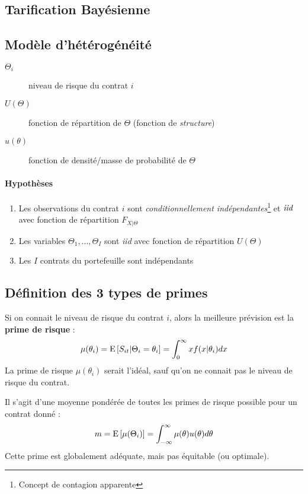 \documentclass[10pt, french]{article}
\begin{document}
\begin{multicols*}{3}
\columnbreak
\section{Tarification Bayésienne}
\subsection*{Modèle d'hétérogénéité}
\begin{description}
\item[$\Theta_i$] niveau de risque du contrat $i$
\item[$U(\Theta)$] fonction de répartition de $\Theta$ (fonction de \emph{structure})
\item[$u(\theta)$] fonction de densité/masse de probabilité de $\Theta$
\end{description}
\paragraph{Hypothèses}
\begin{enumerate}
\item Les observations du contrat $i$ sont \emph{conditionnellement indépendantes}\footnote{Concept de contagion apparente} et $\emph{iid}$ avec fonction de répartition $F_{X|\Theta}$
\item Les variables $\Theta_1, ..., \Theta_I$ sont \emph{iid} avec fonction de répartition $U(\Theta)$
\item Les $I$ contrats du portefeuille sont indépendants
\end{enumerate}

\subsection*{Définition des 3 types de primes}
\begin{definition}
Si on connait le niveau de risque du contrat $i$, alors la meilleure prévision est la \textbf{prime de risque} : 
\begin{equation}
\mu(\theta_i) = \mathrm{E} \left[ S_{it} | \Theta_i = \theta_i \right] = \int_{0}^{\infty} x f(x | \theta_i) dx
\end{equation}
La prime de risque $\mu(\theta_i)$ serait l'idéal, sauf qu'on ne connait pas le niveau de risque du contrat.
\end{definition}

\begin{definition}
Il s'agit d'une moyenne pondérée de toutes les primes de risque possible pour un contrat donné : 
\begin{equation}
m = \mathrm{E} \left[ \mu(\Theta_i) \right] = \int_{-\infty}^{\infty} \mu(\theta) u(\theta) d\theta
\end{equation}
Cette prime est globalement adéquate, mais pas équitable (ou optimale).
\end{definition}


\end{multicols*}
\end{document}
